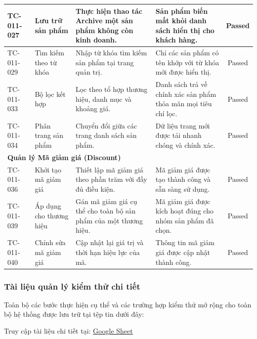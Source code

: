 \begin{table}[H]
\begin{tabularx}{\textwidth}{|l|X|X|X|c|}
TC-011-027 & Lưu trữ sản phẩm & Thực hiện thao tác Archive một sản phẩm không còn kinh doanh. & Sản phẩm biến mất khỏi danh sách hiển thị cho khách hàng. & Passed \\ \hline
TC-011-029 & Tìm kiếm theo từ khóa & Nhập từ khóa tìm kiếm sản phẩm tại trang quản trị. & Chỉ các sản phẩm có tên khớp với từ khóa mới được hiển thị. & Passed \\ \hline
TC-011-033 & Bộ lọc kết hợp & Lọc theo tổ hợp thương hiệu, danh mục và khoảng giá. & Danh sách trả về chính xác sản phẩm thỏa mãn mọi tiêu chí lọc. & Passed \\ \hline
TC-011-034 & Phân trang sản phẩm & Chuyển đổi giữa các trang danh sách sản phẩm. & Dữ liệu trang mới được tải nhanh chóng và chính xác. & Passed \\ \hline
\multicolumn{5}{|l|}{\textbf{Quản lý Mã giảm giá (Discount)}} \\ \hline
TC-011-036 & Khởi tạo mã giảm giá & Thiết lập mã giảm giá theo phần trăm với đầy đủ điều kiện. & Mã giảm giá được tạo thành công và sẵn sàng sử dụng. & Passed \\ \hline
TC-011-039 & Áp dụng cho thương hiệu & Gán mã giảm giá cụ thể cho toàn bộ sản phẩm của một thương hiệu. & Mã giảm giá được kích hoạt đúng cho nhóm sản phẩm đã chọn. & Passed \\ \hline
TC-011-040 & Chỉnh sửa mã giảm giá & Cập nhật lại giá trị và thời hạn hiệu lực của mã. & Thông tin mã giảm giá được cập nhật thành công. & Passed \\ \hline
\end{tabularx}
\end{table}

\subsubsection{Tài liệu quản lý kiểm thử chi tiết}
Toàn bộ các bước thực hiện cụ thể và các trường hợp kiểm thử mở rộng cho toàn bộ hệ thống được lưu trữ tại tệp tin dưới đây:

Truy cập tài liệu chi tiết tại: \href{https://docs.google.com/spreadsheets/d/1mHcj2cuIYbw-0h5_UOIEGGMhs_ll_Lcr/edit?usp=sharing&ouid=108057400976358149425&rtpof=true&sd=true}{Google Sheet}

